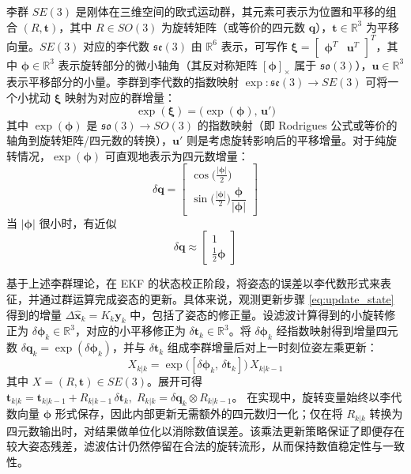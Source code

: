 李群 $SE(3)$ 是刚体在三维空间的欧式运动群，其元素可表示为位置和平移的组合 $(R,\mathbf{t})$，其中 $R\in SO(3)$ 为旋转矩阵（或等价的四元数 $\mathbf{q}$），$\mathbf{t}\in\mathbb{R}^3$ 为平移向量。$SE(3)$ 对应的李代数 $\mathfrak{se}(3)$ 由 $\mathbb{R}^6$ 表示，可写作 $\boldsymbol{\xi}=\begin{bmatrix}\boldsymbol{\phi}^T & \mathbf{u}^T\end{bmatrix}^T$，其中 $\boldsymbol{\phi}\in\mathbb{R}^3$ 表示旋转部分的微小轴角（其反对称矩阵 $[\boldsymbol{\phi}]_\times$ 属于 $\mathfrak{so}(3)$），$\mathbf{u}\in\mathbb{R}^3$ 表示平移部分的小量。李群到李代数的指数映射 $\exp:\mathfrak{se}(3)\!\to\!SE(3)$ 可将一个小扰动 $\boldsymbol{\xi}$ 映射为对应的群增量：
\begin{equation}
	\exp(\boldsymbol{\xi})=\bigl(\exp(\boldsymbol{\phi}),\,\mathbf{u}'\bigr)
\end{equation}
其中 $\exp(\boldsymbol{\phi})$ 是 $\mathfrak{so}(3)\!\to\!SO(3)$ 的指数映射（即 Rodrigues 公式或等价的轴角到旋转矩阵/四元数的转换），$\mathbf{u}'$ 则是考虑旋转影响后的平移增量。对于纯旋转情况，$\exp(\boldsymbol{\phi})$ 可直观地表示为四元数增量：
\begin{equation}
	\delta\mathbf{q}=
	\begin{bmatrix}
		\cos\!\bigl(\tfrac{|\boldsymbol{\phi}|}{2}\bigr) \\
		\sin\!\bigl(\tfrac{|\boldsymbol{\phi}|}{2}\bigr)\dfrac{\boldsymbol{\phi}}{|\boldsymbol{\phi}|}
	\end{bmatrix}
\end{equation}
当 $|\boldsymbol{\phi}|$ 很小时，有近似
\begin{equation}
	\delta\mathbf{q}\approx
	\begin{bmatrix}
		1 \\[2pt] \tfrac{1}{2}\boldsymbol{\phi}
	\end{bmatrix}
\end{equation}

基于上述李群理论，在 EKF 的状态校正阶段，将姿态的误差以李代数形式来表征，并通过群运算完成姿态的更新。具体来说，观测更新步骤 \eqref{eq:update_state} 得到的增量 $\Delta\hat{\mathbf{x}}_k = K_k\mathbf{y}_k$ 中，包括了姿态的修正量。设滤波计算得到的小旋转修正为 $\delta\boldsymbol{\phi}_k\in\mathbb{R}^3$，对应的小平移修正为 $\delta\mathbf{t}_k\in\mathbb{R}^3$。将 $\delta\boldsymbol{\phi}_k$ 经指数映射得到增量四元数 $\delta\mathbf{q}_k=\exp(\delta\boldsymbol{\phi}_k)$，并与 $\delta\mathbf{t}_k$ 组成李群增量后对上一时刻位姿左乘更新：
\begin{equation}
	\label{eq:X_update}
	X_{k|k}= \exp\!\bigl([\delta\boldsymbol{\phi}_k,\,\delta\mathbf{t}_k]\bigr)\,X_{k|k-1}
\end{equation}
其中 $X=(R,\mathbf{t})\in SE(3)$。展开可得
$\mathbf{t}_{k|k}= \mathbf{t}_{k|k-1}+R_{k|k-1}\,\delta\mathbf{t}_k,\;
R_{k|k}= \delta\mathbf{q}_k\otimes R_{k|k-1}$。
在实现中，旋转变量始终以李代数向量 $\boldsymbol{\phi}$ 形式保存，因此内部更新无需额外的四元数归一化；仅在将 $R_{k|k}$ 转换为四元数输出时，对结果做单位化以消除数值误差。该乘法更新策略保证了即便存在较大姿态残差，滤波估计仍然停留在合法的旋转流形，从而保持数值稳定性与一致性。



